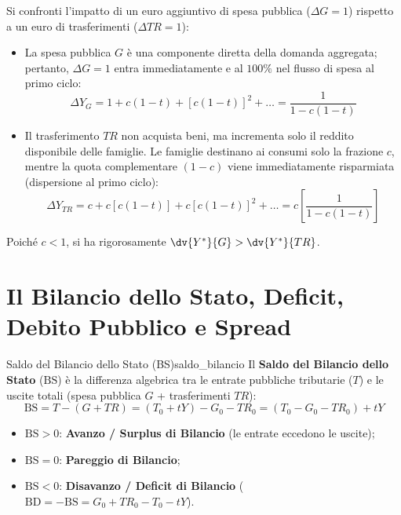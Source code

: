 \begin{dimostrazione}
Si confronti l'impatto di un euro aggiuntivo di spesa pubblica ($\Delta G = 1$) rispetto a un euro di trasferimenti ($\Delta TR = 1$):
\begin{itemize}
    \item La spesa pubblica $G$ è una componente diretta della domanda aggregata; pertanto, $\Delta G = 1$ entra immediatamente e al $100\%$ nel flusso di spesa al primo ciclo:
    \begin{equation}
        \Delta Y_G = 1 + c(1-t) + [c(1-t)]^2 + \dots = \frac{1}{1 - c(1-t)}
    \end{equation}
    \item Il trasferimento $TR$ non acquista beni, ma incrementa solo il reddito disponibile delle famiglie. Le famiglie destinano ai consumi solo la frazione $c$, mentre la quota complementare $(1-c)$ viene immediatamente risparmiata (dispersione al primo ciclo):
    \begin{equation}
        \Delta Y_{TR} = c + c[c(1-t)] + c[c(1-t)]^2 + \dots = c \left[ \frac{1}{1 - c(1-t)} \right]
    \end{equation}
\end{itemize}
Poiché $c < 1$, si ha rigorosamente $\dv{Y^*}{G} > \dv{Y^*}{TR}$.
\end{dimostrazione}

\section{Il Bilancio dello Stato, Deficit, Debito Pubblico e Spread}

\begin{definizione}{Saldo del Bilancio dello Stato (BS)}{saldo_bilancio}
Il \textbf{Saldo del Bilancio dello Stato} ($\mathrm{BS}$) è la differenza algebrica tra le entrate pubbliche tributarie ($T$) e le uscite totali (spesa pubblica $G$ + trasferimenti $TR$):
\begin{equation}
    \mathrm{BS} = T - (G + TR) = (T_0 + t Y) - G_0 - TR_0 = (T_0 - G_0 - TR_0) + t Y
\end{equation}
\begin{itemize}
    \item $\mathrm{BS} > 0$: \textbf{Avanzo / Surplus di Bilancio} (le entrate eccedono le uscite);
    \item $\mathrm{BS} = 0$: \textbf{Pareggio di Bilancio};
    \item $\mathrm{BS} < 0$: \textbf{Disavanzo / Deficit di Bilancio} ($\mathrm{BD} = -\mathrm{BS} = G_0 + TR_0 - T_0 - tY$).
\end{itemize}
\end{definizione}

